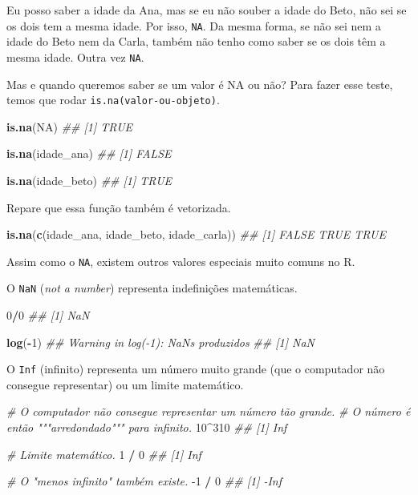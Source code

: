 \documentclass[]{book}
\newenvironment{Shaded}{\begin{snugshade}}{\end{snugshade}}
\newcommand{\CommentTok}[1]{\textcolor[rgb]{0.56,0.35,0.01}{\textit{#1}}}
\newcommand{\DecValTok}[1]{\textcolor[rgb]{0.00,0.00,0.81}{#1}}
\newcommand{\KeywordTok}[1]{\textcolor[rgb]{0.13,0.29,0.53}{\textbf{#1}}}
\newcommand{\NormalTok}[1]{#1}
\newcommand{\OperatorTok}[1]{\textcolor[rgb]{0.81,0.36,0.00}{\textbf{#1}}}
\newcommand{\OtherTok}[1]{\textcolor[rgb]{0.56,0.35,0.01}{#1}}
\newcommand{\StringTok}[1]{\textcolor[rgb]{0.31,0.60,0.02}{#1}}
\begin{document}
Eu posso saber a idade da Ana, mas se eu não souber a idade do Beto, não sei se os dois tem a mesma idade. Por isso, \texttt{NA}. Da mesma forma, se não sei nem a idade do Beto nem da Carla, também não tenho como saber se os dois têm a mesma idade. Outra vez \texttt{NA}.

Mas e quando queremos saber se um valor é NA ou não? Para fazer esse teste, temos que rodar \texttt{is.na(valor-ou-objeto)}.

\begin{Shaded}
\begin{Highlighting}[]
\KeywordTok{is.na}\NormalTok{(}\OtherTok{NA}\NormalTok{)}
\CommentTok{## [1] TRUE}

\KeywordTok{is.na}\NormalTok{(idade_ana)}
\CommentTok{## [1] FALSE}

\KeywordTok{is.na}\NormalTok{(idade_beto)}
\CommentTok{## [1] TRUE}
\end{Highlighting}
\end{Shaded}

Repare que essa função também é vetorizada.

\begin{Shaded}
\begin{Highlighting}[]
\KeywordTok{is.na}\NormalTok{(}\KeywordTok{c}\NormalTok{(idade_ana, idade_beto, idade_carla))}
\CommentTok{## [1] FALSE  TRUE  TRUE}
\end{Highlighting}
\end{Shaded}

Assim como o \texttt{NA}, existem outros valores especiais muito comuns no R.

O \texttt{NaN} (\emph{not a number}) representa indefinições matemáticas.

\begin{Shaded}
\begin{Highlighting}[]
\DecValTok{0}\OperatorTok{/}\DecValTok{0}
\CommentTok{## [1] NaN}

\KeywordTok{log}\NormalTok{(}\OperatorTok{-}\DecValTok{1}\NormalTok{)}
\CommentTok{## Warning in log(-1): NaNs produzidos}
\CommentTok{## [1] NaN}
\end{Highlighting}
\end{Shaded}

O \texttt{Inf} (infinito) representa um número muito grande (que o computador não consegue representar) ou um limite matemático.

\begin{Shaded}
\begin{Highlighting}[]
\CommentTok{# O computador não consegue representar um número tão grande.}
\CommentTok{# O número é então """arredondado""" para infinito.}
\DecValTok{10}\OperatorTok{^}\DecValTok{310}
\CommentTok{## [1] Inf}

\CommentTok{# Limite matemático.}
\DecValTok{1} \OperatorTok{/}\StringTok{ }\DecValTok{0}
\CommentTok{## [1] Inf}

\CommentTok{# O "menos infinito" também existe.}
\DecValTok{-1} \OperatorTok{/}\StringTok{ }\DecValTok{0}
\CommentTok{## [1] -Inf}
\end{Highlighting}
\end{Shaded}
\end{document}
